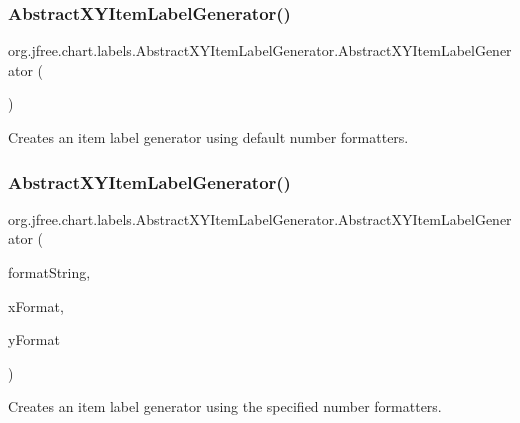 \subsubsection{\texorpdfstring{Abstract\+X\+Y\+Item\+Label\+Generator()}{AbstractXYItemLabelGenerator()}\hspace{0.1cm}{\footnotesize\ttfamily [1/5]}}
{\footnotesize\ttfamily org.\+jfree.\+chart.\+labels.\+Abstract\+X\+Y\+Item\+Label\+Generator.\+Abstract\+X\+Y\+Item\+Label\+Generator (\begin{DoxyParamCaption}{ }\end{DoxyParamCaption})\hspace{0.3cm}{\ttfamily [protected]}}

Creates an item label generator using default number formatters. \mbox{\label{classorg_1_1jfree_1_1chart_1_1labels_1_1_abstract_x_y_item_label_generator_aa8567f572683f09faf89cec22d1fea31}} 
\subsubsection{\texorpdfstring{Abstract\+X\+Y\+Item\+Label\+Generator()}{AbstractXYItemLabelGenerator()}\hspace{0.1cm}{\footnotesize\ttfamily [2/5]}}
{\footnotesize\ttfamily org.\+jfree.\+chart.\+labels.\+Abstract\+X\+Y\+Item\+Label\+Generator.\+Abstract\+X\+Y\+Item\+Label\+Generator (\begin{DoxyParamCaption}\item[{String}]{format\+String,  }\item[{Number\+Format}]{x\+Format,  }\item[{Number\+Format}]{y\+Format }\end{DoxyParamCaption})\hspace{0.3cm}{\ttfamily [protected]}}

Creates an item label generator using the specified number formatters.


